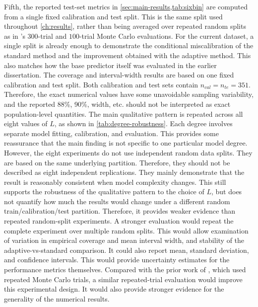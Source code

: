 Fifth, the reported test-set metrics in \cref{sec:main-results,tab:sixbin} are computed from a single fixed calibration and test split. This is the same split used throughout \cref{ch:results}, rather than being averaged over repeated random splits as in \citeauthor{amirishahbazi2026}'s $300$-trial and $100$-trial Monte Carlo evaluations. For the current dataset, a single split is already enough to demonstrate the conditional miscalibration of the standard method and the improvement obtained with the adaptive method. This also matches how the base predictor itself was evaluated in the earlier dissertation. The coverage and interval-width results are based on one fixed calibration and test split. Both calibration and test sets contain $n_{cal}=n_{te}=351$. Therefore, the exact numerical values have some unavoidable sampling variability, and the reported 88\%, 90\%, width, etc. should not be interpreted as exact population-level quantities. The main qualitative pattern is repeated across all eight values of $L$, as shown in \cref{tab:degree-robustness}. Each degree involves separate model fitting, calibration, and evaluation. This provides some reassurance that the main finding is not specific to one particular model degree. However, the eight experiments do not use independent random data splits. They are based on the same underlying partition. Therefore, they should not be described as eight independent replications. They mainly demonstrate that the result is reasonably consistent when model complexity changes. This still supports the robustness of the qualitative pattern to the choice of $L$, but does not quantify how much the results would change under a different random train/calibration/test partition. Therefore, it provides weaker evidence than repeated random-split experiments. A stronger evaluation would repeat the complete experiment over multiple random splits. This would allow examination of variation in empirical coverage and mean interval width, and stability of the adaptive-vs-standard comparison. It could also report mean, standard deviation, and confidence intervals. This would provide uncertainty estimates for the performance metrics themselves. Compared with the prior work of \citeauthor{amirishahbazi2026}, which used repeated Monte Carlo trials, a similar repeated-trial evaluation would improve this experimental design. It would also provide stronger evidence for the generality of the numerical results. 
 

